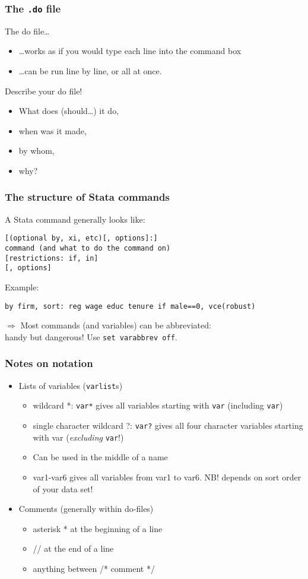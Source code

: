 \documentclass[pdftex, compress]{beamer}
\begin{document}
\begin{frame}
\frametitle{The \texttt{.do} file}
The do file\dots
\begin{itemize}
	\item \dots works as if you would type each line into the command box
	\item \dots can be run line by line, or all at once.
\end{itemize}
\vfill
\alert{Describe your do file!} 
\begin{itemize}
\item[] What does (should\dots) it do,
\item[] when was it made, 
\item[] by whom, 
\item[] why?
\end{itemize}
\end{frame}

\begin{frame}[fragile]
\frametitle{The structure of Stata commands}
A Stata command generally looks like:

\begin{Verbatim}
[(optional by, xi, etc)[, options]:] 
command (and what to do the command on) 
[restrictions: if, in] 
[, options]
\end{Verbatim}
Example:
\begin{verbatim}
by firm, sort: reg wage educ tenure if male==0, vce(robust)
\end{verbatim}

$\Rightarrow$ \alert{Most commands (and variables) can be abbreviated:}\\handy but dangerous! Use \texttt{set varabbrev off}.
\end{frame}

\begin{frame}
\frametitle{Notes on notation}
\begin{itemize}
	\item Lists of variables (\texttt{varlist}s)
	\begin{itemize}
		\item wildcard *: \texttt{var*} gives all variables starting with \texttt{var} (including \texttt{var})
		\item single character wildcard ?: \texttt{var?} gives all four character variables starting with var (\emph{excluding} \texttt{var}!)
		\item Can be used in the middle of a name
		\item var1-var6 gives all variables from var1 to var6. \alert{NB!} depends on sort order of your data set!
	\end{itemize}	
		\item Comments (generally within do-files)
	\begin{itemize}
		\item asterisk * at the beginning of a line
		\item // at the end of a line
		\item anything between /* comment */
	\end{itemize}
\end{itemize}
\end{frame}
\end{document}
